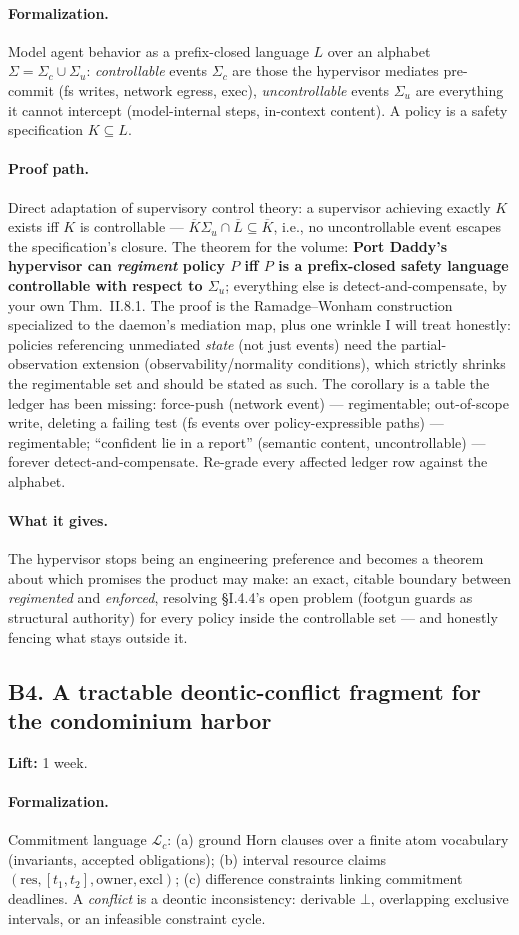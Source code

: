 \documentclass[11pt,a4paper]{article}
\newcommand{\lift}[1]{\noindent\textbf{Lift:} #1.}
\newcommand{\gives}{\paragraph{What it gives.}}
\newcommand{\form}{\paragraph{Formalization.}}
\newcommand{\proofpath}{\paragraph{Proof path.}}
\begin{document}
\form Model agent behavior as a prefix-closed language $L$ over an alphabet $\Sigma = \Sigma_c \cup \Sigma_u$: \emph{controllable} events $\Sigma_c$ are those the hypervisor mediates pre-commit (fs writes, network egress, exec), \emph{uncontrollable} events $\Sigma_u$ are everything it cannot intercept (model-internal steps, in-context content). A policy is a safety specification $K \subseteq L$.

\proofpath Direct adaptation of supervisory control theory: a supervisor achieving exactly $K$ exists iff $K$ is controllable --- $\overline{K}\Sigma_u \cap \overline{L} \subseteq \overline{K}$, i.e., no uncontrollable event escapes the specification's closure. The theorem for the volume: \textbf{Port Daddy's hypervisor can \emph{regiment} policy $P$ iff $P$ is a prefix-closed safety language controllable with respect to $\Sigma_u$}; everything else is detect-and-compensate, by your own Thm.~II.8.1. The proof is the Ramadge--Wonham construction specialized to the daemon's mediation map, plus one wrinkle I will treat honestly: policies referencing unmediated \emph{state} (not just events) need the partial-observation extension (observability/normality conditions), which strictly shrinks the regimentable set and should be stated as such. The corollary is a table the ledger has been missing: force-push (network event) --- regimentable; out-of-scope write, deleting a failing test (fs events over policy-expressible paths) --- regimentable; ``confident lie in a report'' (semantic content, uncontrollable) --- forever detect-and-compensate. Re-grade every affected ledger row against the alphabet.

\gives The hypervisor stops being an engineering preference and becomes a theorem about which promises the product may make: an exact, citable boundary between \emph{regimented} and \emph{enforced}, resolving \S I.4.4's open problem (footgun guards as structural authority) for every policy inside the controllable set --- and honestly fencing what stays outside it.

\subsection{B4. A tractable deontic-conflict fragment for the condominium harbor}
\lift{1 week}

\form Commitment language $\mathcal{L}_c$: (a) ground Horn clauses over a finite atom vocabulary (invariants, accepted obligations); (b) interval resource claims $(\mathrm{res}, [t_1,t_2], \mathrm{owner}, \mathrm{excl})$; (c) difference constraints linking commitment deadlines. A \emph{conflict} is a deontic inconsistency: derivable $\bot$, overlapping exclusive intervals, or an infeasible constraint cycle.
\end{document}
